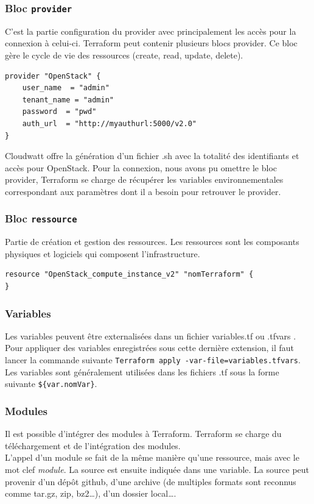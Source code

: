 \documentclass[]{article}
\begin{document}
\subsubsection{\texorpdfstring{Bloc
\textbf{\texttt{provider}}}{Bloc provider}}\label{bloc-provider}
C'est la partie configuration du provider avec principalement les accès
pour la connexion à celui-ci. Terraform peut contenir plusieurs blocs
provider. Ce bloc gère le cycle de vie des ressources (create, read,
update, delete).

\begin{verbatim}
provider "OpenStack" {
    user_name  = "admin"
    tenant_name = "admin"
    password  = "pwd"
    auth_url  = "http://myauthurl:5000/v2.0"
}
\end{verbatim}

Cloudwatt offre la génération d'un fichier .sh avec la totalité des
identifiants et accès pour OpenStack. Pour la connexion, nous avons pu
omettre le bloc provider, Terraform se charge de récupérer les variables
environnementales correspondant aux paramètres dont il a besoin pour
retrouver le provider.

\subsubsection{\texorpdfstring{Bloc
\textbf{\texttt{ressource}}}{Bloc ressource}}\label{bloc-resource}
Partie de création et gestion des ressources. Les ressources sont les composants physiques et logiciels qui composent l'infrastructure.
\begin{verbatim}
resource "OpenStack_compute_instance_v2" "nomTerraform" {
}
\end{verbatim}

\subsubsection{Variables}\label{variables}
Les variables peuvent être externalisées dans un fichier
\og variables.tf \fg ou \og
.tfvars \fg. Pour appliquer des variables enregistrées
sous cette dernière extension, il faut lancer la commande suivante
\texttt{Terraform\ apply\ -var-file=variables.tfvars}. Les variables sont
généralement utilisées dans les fichiers .tf sous la forme suivante
\texttt{\$\{var.nomVar\}}.

\subsubsection{Modules}\label{modules}
Il est possible d'intégrer des modules à Terraform. Terraform se charge
du téléchargement et de l'intégration des modules. \\
L'appel d'un module
se fait de la même manière qu'une ressource, mais avec le mot clef
\emph{module}. La source est ensuite indiquée dans une variable. La
source peut provenir d'un dépôt github, d'une archive (de multiples
formats sont reconnus comme tar.gz, zip, bz2\ldots{}), d'un dossier
local\ldots{}. 
\end{document}
